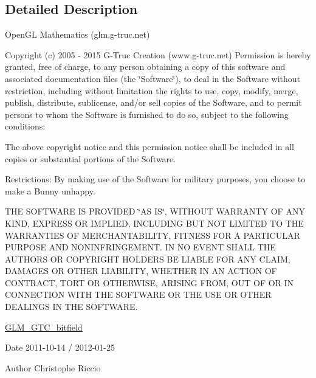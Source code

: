 \subsection{Detailed Description}
Open\+G\+L Mathematics (glm.\+g-\/truc.\+net)

Copyright (c) 2005 -\/ 2015 G-\/\+Truc Creation (www.\+g-\/truc.\+net) Permission is hereby granted, free of charge, to any person obtaining a copy of this software and associated documentation files (the \char`\"{}\+Software\char`\"{}), to deal in the Software without restriction, including without limitation the rights to use, copy, modify, merge, publish, distribute, sublicense, and/or sell copies of the Software, and to permit persons to whom the Software is furnished to do so, subject to the following conditions\+:

The above copyright notice and this permission notice shall be included in all copies or substantial portions of the Software.

Restrictions\+: By making use of the Software for military purposes, you choose to make a Bunny unhappy.

T\+H\+E S\+O\+F\+T\+W\+A\+R\+E I\+S P\+R\+O\+V\+I\+D\+E\+D \char`\"{}\+A\+S I\+S\char`\"{}, W\+I\+T\+H\+O\+U\+T W\+A\+R\+R\+A\+N\+T\+Y O\+F A\+N\+Y K\+I\+N\+D, E\+X\+P\+R\+E\+S\+S O\+R I\+M\+P\+L\+I\+E\+D, I\+N\+C\+L\+U\+D\+I\+N\+G B\+U\+T N\+O\+T L\+I\+M\+I\+T\+E\+D T\+O T\+H\+E W\+A\+R\+R\+A\+N\+T\+I\+E\+S O\+F M\+E\+R\+C\+H\+A\+N\+T\+A\+B\+I\+L\+I\+T\+Y, F\+I\+T\+N\+E\+S\+S F\+O\+R A P\+A\+R\+T\+I\+C\+U\+L\+A\+R P\+U\+R\+P\+O\+S\+E A\+N\+D N\+O\+N\+I\+N\+F\+R\+I\+N\+G\+E\+M\+E\+N\+T. I\+N N\+O E\+V\+E\+N\+T S\+H\+A\+L\+L T\+H\+E A\+U\+T\+H\+O\+R\+S O\+R C\+O\+P\+Y\+R\+I\+G\+H\+T H\+O\+L\+D\+E\+R\+S B\+E L\+I\+A\+B\+L\+E F\+O\+R A\+N\+Y C\+L\+A\+I\+M, D\+A\+M\+A\+G\+E\+S O\+R O\+T\+H\+E\+R L\+I\+A\+B\+I\+L\+I\+T\+Y, W\+H\+E\+T\+H\+E\+R I\+N A\+N A\+C\+T\+I\+O\+N O\+F C\+O\+N\+T\+R\+A\+C\+T, T\+O\+R\+T O\+R O\+T\+H\+E\+R\+W\+I\+S\+E, A\+R\+I\+S\+I\+N\+G F\+R\+O\+M, O\+U\+T O\+F O\+R I\+N C\+O\+N\+N\+E\+C\+T\+I\+O\+N W\+I\+T\+H T\+H\+E S\+O\+F\+T\+W\+A\+R\+E O\+R T\+H\+E U\+S\+E O\+R O\+T\+H\+E\+R D\+E\+A\+L\+I\+N\+G\+S I\+N T\+H\+E S\+O\+F\+T\+W\+A\+R\+E.

\hyperlink{group__gtc__bitfield}{G\+L\+M\+\_\+\+G\+T\+C\+\_\+bitfield}

\begin{DoxyDate}{Date}
2011-\/10-\/14 / 2012-\/01-\/25 
\end{DoxyDate}
\begin{DoxyAuthor}{Author}
Christophe Riccio 
\end{DoxyAuthor}
